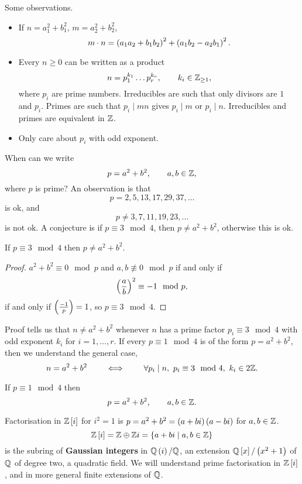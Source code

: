 Some observations.
\begin{itemize}
\item If $ n = a_1^2 + b_1^2 $, $ m = a_2^2 + b_2^2 $,
$$ m \cdot n = \left( a_1a_2 + b_1b_2 \right)^2 + \left( a_1b_2 - a_2b_1 \right)^2. $$
\item Every $ n \ge 0 $ can be written as a product
$$ n = p_1^{k_1} \dots p_r^{k_r}, \qquad k_i \in \mathbb{Z}_{\ge 1}, $$
where $ p_i $ are prime numbers. Irreducibles are such that only divisors are $ 1 $ and $ p_i $. Primes are such that $ p_i \mid mn $ gives $ p_i \mid m $ or $ p_i \mid n $. Irreducibles and primes are equivalent in $ \mathbb{Z} $.
\item Only care about $ p_i $ with odd exponent.
\end{itemize}
When can we write
$$ p = a^2 + b^2, \qquad a, b \in \mathbb{Z}, $$
where $ p $ is prime? An observation is that
$$ p = 2, 5, 13, 17, 29, 37, \dots $$
is ok, and
$$ p \ne 3, 7, 11, 19, 23, \dots $$
is not ok. A conjecture is if $ p \equiv 3 \mod 4 $, then $ p \ne a^2 + b^2 $, otherwise this is ok.

\pagebreak

\begin{theorem}
If $ p \equiv 3 \mod 4 $ then $ p \ne a^2 + b^2 $.
\end{theorem}

\begin{proof}
$ a^2 + b^2 \equiv 0 \mod p $ and $ a, b \not\equiv 0 \mod p $ if and only if
$$ \left( \dfrac{a}{b} \right)^2 \equiv -1 \mod p, $$
if and only if $ \left( \tfrac{-1}{p} \right) = 1 $, so $ p \equiv 3 \mod 4 $.
\end{proof}

\begin{remark*}
Proof tells us that $ n \ne a^2 + b^2 $ whenever $ n $ has a prime factor $ p_i \equiv 3 \mod 4 $ with odd exponent $ k_i $ for $ i = 1, \dots, r $. If every $ p \equiv 1 \mod 4 $ is of the form $ p = a^2 + b^2 $, then we understand the general case,
$$ n = a^2 + b^2 \qquad \iff \qquad \forall p_i \mid n, \ p_i \equiv 3 \mod 4, \ k_i \in 2\mathbb{Z}. $$
\end{remark*}

\begin{theorem}
If $ p \equiv 1 \mod 4 $ then
$$ p = a^2 + b^2, \qquad a, b \in \mathbb{Z}. $$
\end{theorem}

Factorisation in $ \mathbb{Z}\left[ i \right] $ for $ i^2 = 1 $ is $ p = a^2 + b^2 = \left( a + bi \right)\left( a - bi \right) $ for $ a, b \in \mathbb{Z} $.
$$ \mathbb{Z}\left[ i \right] = \mathbb{Z} \oplus \mathbb{Z} i = \left\{ a + bi \mid a, b \in \mathbb{Z} \right\} $$
is the subring of \textbf{Gaussian integers} in $ \mathbb{Q}\left( i \right) / \mathbb{Q} $, an extension $ \mathbb{Q}\left[ x \right] / \left( x^2 + 1 \right) $ of $ \mathbb{Q} $ of degree two, a quadratic field. We will understand prime factorisation in $ \mathbb{Z}\left[ i \right] $, and in more general finite extensions of $ \mathbb{Q} $.

